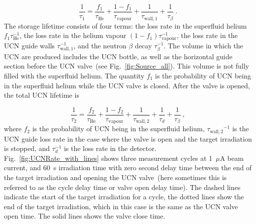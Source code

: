 \begin{equation}
  \label{eqn:tau1}
  \frac{1}{\tau_1} = \frac{ f_1}{\tau_\mathrm{He}} + \frac{1-f_1}{\tau_\mathrm{vapour}}+\frac{1}{\tau_\mathrm{wall,1}} + \frac{1}{\tau_\beta}~.
\end{equation}
The storage lifetime consists of four terms: the loss rate in the
superfluid helium $ f_1\tau_\mathrm{He}^{-1}$, the loss rate in the
helium vapour $(1-f_1)\tau_\mathrm{vapour}^{-1}$, the loss rate in the
UCN guide walls $\tau_\mathrm{wall,1}^{-1}$, and the neutron $\beta$
decay $\tau_\beta^{-1}$. The volume in which the UCN are produced
includes the UCN bottle, as well as the horizontal guide section
before the UCN valve~(see Fig.~\ref{fig:Source_all}). This volume is
not fully filled with the superfluid helium. The quantity $ f_1$ is
the probability of UCN being in the superfluid helium while the UCN
valve is closed. After the valve is opened, the total UCN lifetime is

\begin{equation}
  \label{eqn:tau2}
  \frac{1}{\tau_2} = \frac{ f_2}{\tau_\mathrm{He}} + \frac{1-f_2}{\tau_\mathrm{vapour}}+ \frac{1}{\tau_\mathrm{wall,2}}+\frac{1}{\tau_d} + \frac{1}{\tau_\beta}~,
\end{equation}
where $f_2$ is the probability of UCN being in the superfluid helium,
${\tau_\mathrm{wall,2}}^{-1}$ is the UCN guide loss rate in the case
where the valve is open and the target irradiation is stopped, and
$\tau_d^{-1}$ is the loss rate in the
detector. Fig.~\ref{fig:UCNRate_with_lines} shows three measurement
cycles at 1~$\mu$A beam current, and 60~s irradiation time with zero
second delay time between the end of the target irradiation and
opening the UCN valve~(here sometimes this is referred to as the cycle
delay time or valve open delay time). The dashed lines indicate the
start of the target irradiation for a cycle, the dotted lines show the
end of the target irradiation, which in this case is the same as the
UCN valve open time. The solid lines shows the valve close time.



